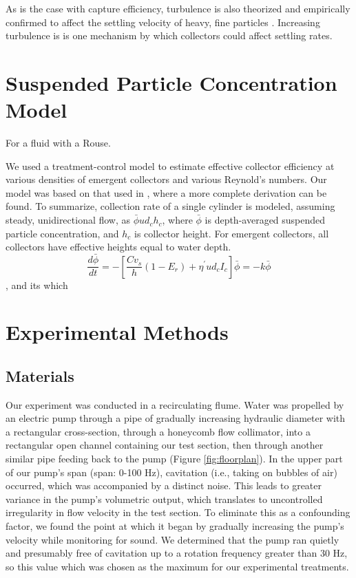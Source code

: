 \documentclass{scrreprt}
\begin{document}
As is the case with capture efficiency, turbulence is also theorized and empirically confirmed to affect the settling velocity of heavy, fine particles \citep{Nielsen_1993, Wang_2018}. Increasing turbulence is is one mechanism by which collectors could affect settling rates.

\section{Suspended Particle Concentration Model}

For a fluid with a Rouse.

We used a treatment-control model to estimate effective collector efficiency at various densities of emergent collectors and various Reynold's numbers. Our model was based on that used in \cite{Fauria_2015}, where a more complete derivation can be found. To summarize, collection rate of a single cylinder is modeled, assuming steady, unidirectional flow, as $\bar{\phi}ud_ch_c$, where $\bar{\phi}$ is depth-averaged suspended particle concentration, and $h_c$ is collector height. For emergent collectors, all collectors have effective heights equal to water depth. \[\frac{d\bar{\phi}}{dt} = -[\frac{Cv_s}{h}(1-E_r) + \eta^{\prime}ud_cI_c]\bar{\phi} = -k\bar{\phi}\], %
and its which 


\section{Experimental Methods}

\subsection{Materials}

Our experiment was conducted in a recirculating flume. Water was propelled by an electric pump through a pipe of gradually increasing hydraulic diameter with a rectangular cross-section, through a honeycomb flow collimator, into a rectangular open channel containing our test section, then through another similar pipe feeding back to the pump (Figure \ref{fig:floorplan}). In the upper part of our pump's span (span: 0-100 Hz), cavitation (i.e., taking on bubbles of air) occurred, which was accompanied by a distinct noise. This leads to greater variance in the pump's volumetric output, which translates to uncontrolled irregularity in flow velocity in the test section. To eliminate this as a confounding factor, we found the point at which it began by gradually increasing the pump's velocity while monitoring for sound. We determined that the pump ran quietly and presumably free of cavitation up to a rotation frequency greater than 30 Hz, so this value which was chosen as the maximum for our experimental treatments.
\end{document}
